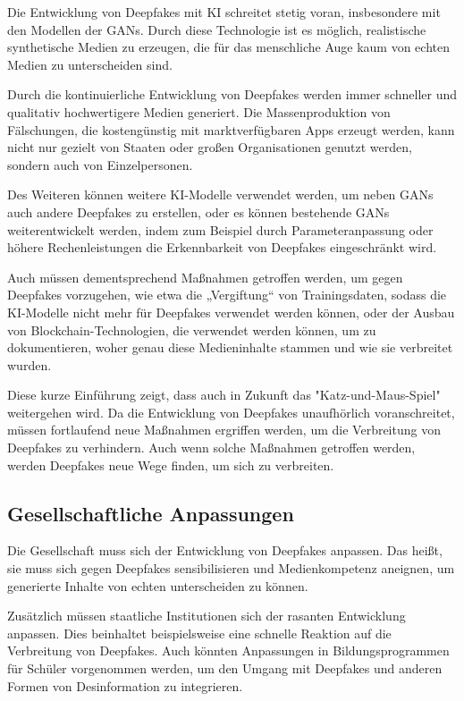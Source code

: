 \documentclass[a4paper,12pt]{article}
\begin{document}
Die Entwicklung von Deepfakes mit KI schreitet stetig voran, insbesondere mit den Modellen der GANs. Durch diese Technologie ist es möglich, realistische synthetische Medien zu erzeugen, die für das menschliche Auge kaum von echten Medien zu unterscheiden sind.  

Durch die kontinuierliche Entwicklung von Deepfakes werden immer schneller und qualitativ hochwertigere Medien generiert. Die Massenproduktion von Fälschungen, die kostengünstig mit marktverfügbaren Apps erzeugt werden, kann nicht nur gezielt von Staaten oder großen Organisationen genutzt werden, sondern auch von Einzelpersonen. \cite{SWP2024}

Des Weiteren können weitere KI-Modelle verwendet werden, um neben GANs auch andere Deepfakes zu erstellen, oder es können bestehende GANs weiterentwickelt werden, indem zum Beispiel durch Parameteranpassung oder höhere Rechenleistungen die Erkennbarkeit von Deepfakes eingeschränkt wird. \cite{SWP2024}

Auch müssen dementsprechend Maßnahmen getroffen werden, um gegen Deepfakes vorzugehen, wie etwa die „Vergiftung“ von Trainingsdaten, sodass die KI-Modelle nicht mehr für Deepfakes verwendet werden können, oder der Ausbau von Blockchain-Technologien, die verwendet werden können, um zu dokumentieren, woher genau diese Medieninhalte stammen und wie sie verbreitet wurden. \cite{SWP2024} \cite{KAS2024}

Diese kurze Einführung zeigt, dass auch in Zukunft das "Katz-und-Maus-Spiel" weitergehen wird. Da die Entwicklung von Deepfakes unaufhörlich voranschreitet, müssen fortlaufend neue Maßnahmen ergriffen werden, um die Verbreitung von Deepfakes zu verhindern. Auch wenn solche Maßnahmen getroffen werden, werden Deepfakes neue Wege finden, um sich zu verbreiten.
\subsection{Gesellschaftliche Anpassungen}
Die Gesellschaft muss sich der Entwicklung von Deepfakes anpassen. Das heißt, sie muss sich gegen Deepfakes sensibilisieren und Medienkompetenz aneignen, um generierte Inhalte von echten unterscheiden zu können.\cite{KIT2021}\cite{KAS2024}\cite{Fraunhofer2024}

Zusätzlich müssen staatliche Institutionen sich der rasanten Entwicklung anpassen. Dies beinhaltet beispielsweise eine schnelle Reaktion auf die Verbreitung von Deepfakes. Auch könnten Anpassungen in Bildungsprogrammen für Schüler vorgenommen werden, um den Umgang mit Deepfakes und anderen Formen von Desinformation zu integrieren.\cite{SWP2024}\cite{Fraunhofer2024}
\end{document}
